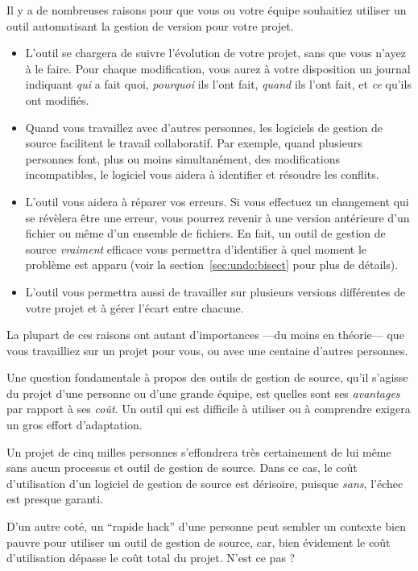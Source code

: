 Il y a de nombreuses raisons pour que vous ou votre équipe souhaitiez
utiliser un outil automatisant la gestion de version pour votre projet.
\begin{itemize}
\item L'outil se chargera de suivre l'évolution de votre projet, sans
que vous n'ayez à le faire. Pour chaque modification, vous aurez à votre
disposition un journal indiquant \emph{qui} a fait quoi, \emph{pourquoi}
ils l'ont fait, \emph{quand} ils l'ont fait, et \emph{ce} qu'ils ont
modifiés.
\item Quand vous travaillez avec d'autres personnes, les logiciels de 
gestion de source facilitent le travail collaboratif. Par exemple, quand
plusieurs personnes font, plus ou moins simultanément, des modifications
incompatibles, le logiciel vous aidera à identifier et résoudre les conflits.
\item L'outil vous aidera à réparer vos erreurs. Si vous effectuez un changement
qui se révèlera être une erreur, vous pourrez revenir à une version
antérieure d'un fichier ou même d'un ensemble de fichiers. En fait, un outil de
gestion de source \emph{vraiment} efficace vous permettra d'identifier à quel
moment le problème est apparu (voir la section~\ref{sec:undo:bisect} pour plus
de détails).
\item L'outil vous permettra aussi de travailler sur plusieurs versions différentes
de votre projet et à gérer l'écart entre chacune.
\end{itemize}
La plupart de ces raisons ont autant d'importances ---du moins en théorie--- que
vous travailliez sur un projet pour vous, ou avec une centaine d'autres
personnes.

Une question fondamentale à propos des outils de gestion de source, qu'il s'agisse
du projet d'une personne ou d'une grande équipe, est quelles sont ses  
\emph{avantages} par rapport à ses \emph{coût}. Un outil qui est difficile à 
utiliser ou à comprendre exigera un gros effort d'adaptation.

Un projet de cinq milles personnes s'effondrera très certainement de lui même
sans aucun processus et outil de gestion de source. Dans ce cas, le coût 
d'utilisation d'un logiciel de gestion de source est dérisoire, puisque 
\emph{sans}, l'échec est presque garanti.

D'un autre coté, un ``rapide hack'' d'une personne peut sembler un contexte
bien pauvre pour utiliser un outil de gestion de source, car, bien évidement
le coût d'utilisation dépasse le coût total du projet. N'est ce pas ?

